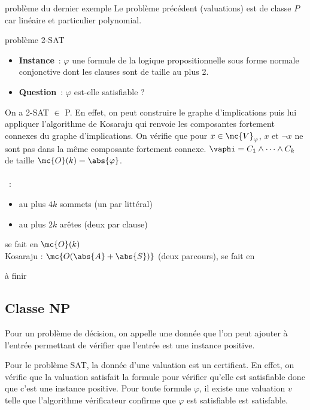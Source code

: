 \begin{adjustwidth}{-3cm}{-3cm}
\begin{exemple}{}{problème du dernier exemple}
    Le problème précédent (valuations) est de classe $P$ car linéaire et particulier polynomial.
\end{exemple}

\begin{exemple}{}{problème 2-SAT}
    \begin{itemize}
        \item \textbf{Instance}~: $\varphi$ une formule de la logique propositionnelle sous forme normale conjonctive dont les clauses sont de taille au plus 2.
        \item \textbf{Question}~: $\varphi$ est-elle satisfiable ?
    \end{itemize}
    On a 2-SAT $\in$ P. En effet, on peut construire le graphe d'implications puis lui appliquer l'algorithme de Kosaraju qui renvoie les composantes fortement connexes du graphe d'implications. On vérifie que pour $x \in \mc{V}_\varphi$, $x$ et $\lnot x$ ne sont pas dans la même composante fortement connexe. $\vaphi = C_1 \wedge \dots \wedge C_k$ de taille $\mc{O}(k) = \abs{\varphi}$.\\\\
    ~:
    \begin{itemize}
        \item au plus $4k$ sommets (un par littéral)
        \item au plus $2k$ arêtes (deux par clause)
    \end{itemize}
    se fait en $\mc{O}(k)$\\
    Kosaraju  : $\mc{O(\abs{A} + \abs{S})}$ (deux parcours), se fait en 

    à finir
\end{exemple}

\subsection{Classe NP}

\begin{definition}{}{}
    Pour un problème de décision, on appelle  une donnée que l'on peut ajouter à l'entrée permettant de vérifier que l'entrée est une instance positive.
\end{definition}

\begin{exemple}{}{}
    Pour le problème SAT, la donnée d'une valuation est un certificat. En effet, on vérifie que la valuation satisfait la formule pour vérifier qu'elle est satisfiable donc que c'est une instance positive.
    Pour toute formule $\varphi$, il existe une valuation $v$ telle que l'algorithme vérificateur confirme que $\varphi$ est satisfiable est satisfable.
\end{exemple}


\end{adjustwidth}
